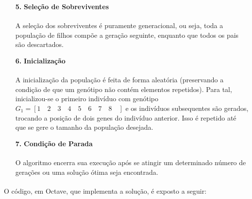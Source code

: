 \documentclass{report}
\begin{document}
\begin{itemize}
		\item[\textbf{5.}] \textbf{Seleção de Sobreviventes}
		
		\paragraph{} A seleção dos sobreviventes é puramente generacional, ou seja, toda a população de filhos compõe a geração seguinte, enquanto que todos os pais são descartados.\\
		
		\item[\textbf{6.}] \textbf{Inicialização}
		
		\paragraph{} A inicialização da população é feita de forma aleatória (preservando a condição de que um genótipo não contém elementos repetidos). Para tal, inicializou-se o primeiro indivíduo com genótipo $G_1 = [1 \quad 2 \quad 3 \quad 4 \quad 5 \quad 6 \quad 7 \quad 8 \quad]$ e os indivíduos subsequentes são gerados, trocando a posição de dois genes do indivíduo anterior. Isso é repetido até que se gere o tamanho da população desejada.\\
		
		\item[\textbf{7.}] \textbf{Condição de Parada}
		
		\paragraph{} O algoritmo encerra sua execução após se atingir um determinado número de gerações ou uma solução ótima seja encontrada.\\
	\end{itemize}
	
	\paragraph{} O código, em Octave, que implementa a solução, é exposto a seguir:\\
	
\end{document}
